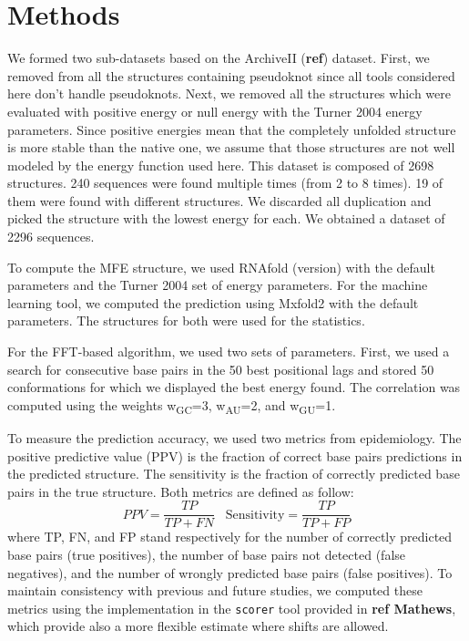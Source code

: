 \documentclass[a4paper,12pt]{article}
\begin{document}
{{\section{Methods}
\label{sec:org41ef84c}
We formed two sub-datasets based on the ArchiveII (\textbf{ref}) dataset. First, we
removed from all the structures containing pseudoknot since all tools considered
here don't handle pseudoknots. Next, we removed all the structures which were
evaluated with positive energy or null energy with the Turner 2004 energy
parameters. Since positive energies mean that the completely unfolded structure
is more stable than the native one, we assume that those structures are not well
modeled by the energy function used here. This dataset is composed of 2698
structures. 240 sequences were found multiple times (from 2 to 8 times). 19 of
them were found with different structures. We discarded all duplication and
picked the structure with the lowest energy for each. We obtained a dataset of
2296 sequences.

To compute the MFE structure, we used RNAfold (version) with the default
parameters and the Turner 2004 set of energy parameters. For the machine
learning tool, we computed the prediction using Mxfold2 with the default
parameters. The structures for both were used for the statistics.

For the FFT-based algorithm, we used two sets of parameters. First, we used a
search for consecutive base pairs in the 50 best positional lags and stored 50
conformations for which we displayed the best energy found. The correlation was
computed using the weights w\textsubscript{GC}=3, w\textsubscript{AU}=2, and w\textsubscript{GU}=1.

To measure the prediction accuracy, we used two metrics from epidemiology. The
positive predictive value (PPV) is the fraction of correct base pairs
predictions in the predicted structure. The sensitivity is the fraction of
correctly predicted base pairs in the true structure. Both metrics are defined
as follow:
\begin{equation}
PPV = \frac{TP}{TP + FN} \;\;\; \text{Sensitivity} = \frac{TP}{TP+FP}
\end{equation}
where TP, FN, and FP stand respectively for the number of correctly predicted
base pairs (true positives), the number of base pairs not detected (false
negatives), and the number of wrongly predicted base pairs (false positives). To
maintain consistency with previous and future studies, we computed these metrics
using the implementation in the \texttt{scorer} tool provided in \textbf{ref Mathews}, which
provide also a more flexible estimate where shifts are allowed.

}}
\end{document}
